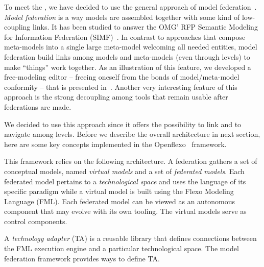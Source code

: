
To meet the \mpc, we have decided to use the general
approach of model federation~\cite{Golra2016-federation}. \emph{Model
  federation} is a way models are assembled together with some kind of
low-coupling links. It has been studied to answer the OMG' RFP
Semantic Modeling for Information Federation (SIMF)~\cite{simf}. In
contrast to approaches that compose meta-models into a single large
meta-model welcoming all needed entities, model federation build links
among models and meta-models (even through levels) to make ``things''
work together. As an illustration of this feature, we developed a
free-modeling editor -- freeing oneself from the bonds of
model/meta-model conformity -- that is presented
in~\cite{models2016-freemodel}. Another very interesting feature of
this approach is the strong decoupling among tools that remain usable
after federations are made.

We decided to use this approach since it offers the possibility to
link and to navigate among levels. Before we describe the overall
architecture in next section, here are some key concepts implemented
in the Openflexo~\cite{openflexo_link} framework.


This framework relies on the following architecture. A federation
gathers a set of conceptual models, named \emph{virtual models} and a
set of \emph{federated models}. Each federated model pertains to a
\emph{technological space} and uses the language of its specific
paradigm while a virtual model is built using the Flexo Modeling
Language (FML). Each federated model can be viewed as an autonomous
component that may evolve with its own tooling. The virtual models
serve as control components.

A \emph{technology adapter} (TA) is a reusable library that defines
connections between the FML execution engine and a particular
technological space. The model federation framework provides ways to
define TA.

